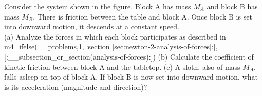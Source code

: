 Consider the system shown in the figure. Block A has mass $M_A$
and block B has mass $M_B$. There is friction between the table 
and block A. Once block B is set into downward motion, it
descends at a constant speed.\\
%
(a) Analyze the forces in which each block participates as described
in m4_ifelse(__problems,1,[:section \ref{sec:newton-2-analysis-of-forces}:],[:__subsection_or_section(analysis-of-forces):])\hwendpart
%
(b) Calculate the coefficient of kinetic friction between block A and
the tabletop.\hwendpart
%
(c) A sloth, also of mass $M_A$, falls asleep on top of block A. If
block B is now set into downward motion, what is its acceleration
(magnitude and direction)?
